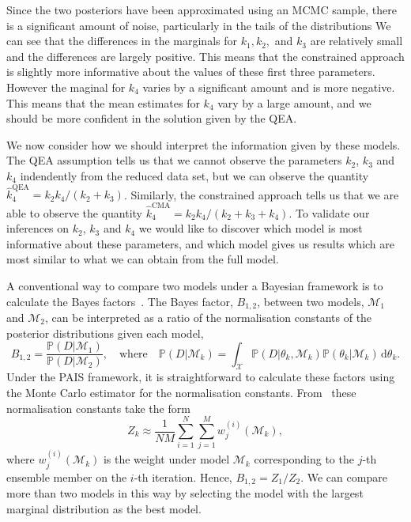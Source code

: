 \documentclass[final]{siamltex}
\begin{document}
Since the two posteriors have been approximated using an MCMC sample, there is a significant amount of noise, particularly in the tails of the distributions We can see that the differences in the marginals for $k_1, k_2,$ and $k_3$ are relatively small and the differences are largely positive. This means that the constrained approach is slightly more informative about the values of these first three parameters. However the maginal for $k_4$ varies by a significant amount and is more negative. This means that the mean estimates for $k_4$ vary by a large amount, and we should be more confident in the solution given by the QEA.

We now consider how we should interpret the information given by these models. The QEA assumption tells us that we cannot observe the parameters $k_2$, $k_3$ and $k_4$ indendently from the reduced data set, but we can observe the quantity $\hat{k}_4^{\text{QEA}} = k_2k_4/(k_2+k_3)$. Similarly, the constrained approach tells us that we are able to observe the quantity $\hat{k}_4^{\text{CMA}} = k_2k_4/(k_2+k_3+k_4)$. To validate our inferences on $k_2$, $k_3$ and $k_4$ we would like to discover which model is most informative about these parameters, and which model gives us results which are most similar to what we can obtain from the full model.

A conventional way to compare two models under a Bayesian framework is to calculate the Bayes factors~\cite{chen2012monte}. The Bayes factor, $B_{1,2}$, between two models, $\mathcal{M}_1$ and $\mathcal{M}_2$, can be interpreted as a ratio of the normalisation constants of the posterior distributions given each model,
\[
	B_{1,2} = \frac{\mathbb{P}(D|\mathcal{M}_1)}{\mathbb{P}(D|\mathcal{M}_2)}, \quad \text{where} \quad \mathbb{P}(D|\mathcal{M}_k) = \int_\mathcal{X} \mathbb{P}(D|\theta_k,\mathcal{M}_k)\mathbb{P}(\theta_k|\mathcal{M}_k) \, \text{d}\theta_k.
\]
Under the PAIS framework, it is straightforward to calculate these factors using the Monte Carlo estimator for the normalisation constants. From~\cite{robert2013monte} these normalisation constants take the form
\[
	Z_k \approx \frac{1}{NM}\sum_{i=1}^N\sum_{j=1}^M w_j^{(i)}(\mathcal{M}_k),
\]
where $w_j^{(i)}(\mathcal{M}_k)$ is the weight under model $\mathcal{M}_k$ corresponding to the $j$-th ensemble member on the $i$-th iteration. Hence, $B_{1,2} = Z_1/Z_2$. We can compare more than two models in this way by selecting the model with the largest marginal distribution as the best model.
\end{document}

